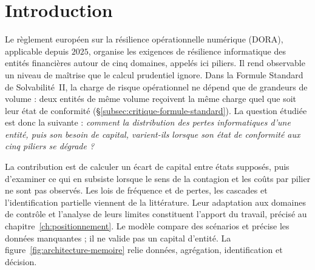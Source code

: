 ﻿%

\chapter*{Introduction}
{}
\label{subsec:problematique-positionnement}

Le règlement européen sur la résilience opérationnelle numérique (DORA), applicable depuis $2025$,
organise les exigences de résilience informatique des entités financières autour de cinq domaines,
appelés ici piliers. Il rend observable un niveau de maîtrise que le calcul prudentiel ignore. Dans
la Formule Standard de Solvabilité~II, la charge de risque opérationnel ne dépend que de grandeurs
de volume : deux entités de même volume reçoivent la même charge quel que soit leur
état de conformité (\S\ref{subsec:critique-formule-standard}). La question étudiée est donc la
suivante : \emph{comment la distribution des pertes informatiques d'une entité, puis son besoin de
capital, varient-ils lorsque son état de conformité aux cinq piliers se dégrade ?}

La contribution est de calculer un écart de capital entre états supposés, puis d'examiner ce qui
en subsiste lorsque le sens de la contagion et les coûts par pilier ne sont pas observés.
Les lois de fréquence et de pertes, les cascades et l'identification partielle viennent de la
littérature. Leur adaptation aux domaines de contrôle et l'analyse de leurs limites constituent
l'apport du travail, précisé au chapitre~\ref{ch:positionnement}. Le modèle compare des scénarios
et précise les données manquantes ; il ne valide pas un capital d'entité.
La figure~\ref{fig:architecture-memoire} relie données, agrégation, identification et décision.

